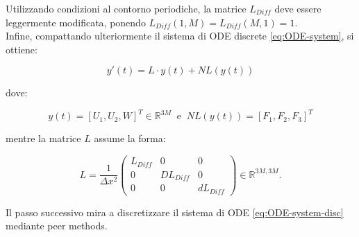 \noindent Utilizzando condizioni al contorno periodiche, la matrice $L_{Diff}$ deve essere leggermente modificata, ponendo $L_{Diff}(1, M) = L_{Diff}(M, 1) = 1$. \\

\noindent Infine, compattando ulteriormente il sistema di ODE discrete \eqref{eq:ODE-system}, si ottiene:

\begin{equation}
    y'(t) = L \cdot y(t) + N L(y(t)) \label{eq:ODE-system-disc}
\end{equation}

\noindent dove:

\begin{equation}
    y(t) = [U_1, U_2, W]^T \in \mathbb{R} ^{3M} \ \text{ e } \ NL(y(t)) = [F_1, F_2, F_3]^T
    \label{eq:yt-system}
\end{equation}

\noindent mentre la matrice $L$ assume la forma:

\begin{equation}
    L = \frac{1}{\Delta x^2} 
\begin{pmatrix}
    L_{Diff} & 0 & 0 \\
    0 & DL_{Diff} & 0 \\
    0 & 0 & dL_{Diff}
 \end{pmatrix}
 \in \mathbb{R} ^ {3M, 3M} \label{eq:matrix-L}.
\end{equation}

\noindent Il passo successivo mira a discretizzare il sistema di ODE \eqref{eq:ODE-system-disc} mediante peer methods.

